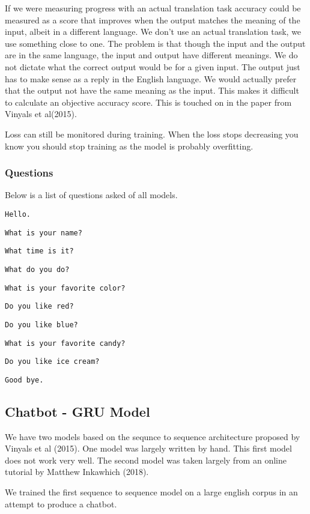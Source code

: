 If we were measuring progress with an actual translation task accuracy could be measured as a score that improves when the output matches the meaning of the input, albeit in a different language. We don't use an actual translation task, we use something close to one. The problem is that though the input and the output are in the same language, the input and output have different meanings. We do not dictate what the correct output would be for a given input. The output just has to make sense as a reply in the English language. We would actually prefer that the output not have the same meaning as the input. This makes it difficult to calculate an objective accuracy score. This is touched on in the paper from Vinyals et al(2015)\cite{DBLP:journals/corr/VinyalsL15}.

Loss can still be monitored during training. When the loss stops decreasing you know you should stop training as the model is probably overfitting.

\subsubsection*{Questions}
Below is a list of questions asked of all models.


\texttt{Hello.}

\texttt{What is your name?}

\texttt{What time is it?}

\texttt{What do you do?}

\texttt{What is your favorite color?}

\texttt{Do you like red?}

\texttt{Do you like blue?}

\texttt{What is your favorite candy?}

\texttt{Do you like ice cream?}

\texttt{Good bye.}



\subsection{Chatbot - GRU Model}
We have two models based on the sequnce to sequence architecture proposed by Vinyals et al (2015)\cite{DBLP:journals/corr/VinyalsL15}. One model was largely written by hand. This first model does not work very well. The second model was taken largely from an online tutorial by Matthew Inkawhich (2018)\cite{2018Inkawhich}.

We trained the first sequence to sequence model on a large english
corpus in an attempt to produce a chatbot. 

